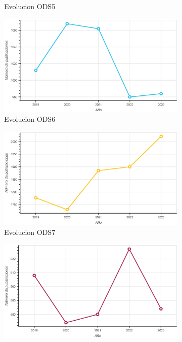 \begin{figure}[H]
\begin{subfigure}{0.45\textwidth}
        \captionsetup{justification=centering}
        \caption{Evolucion ODS5}
        \label{fig:Evolucion ods5}
    \end{subfigure}
    \begin{subfigure}{0.45\textwidth}
        \includegraphics[width=0.9\linewidth]{imagenes/EvolucionOds6.eps} 
        \captionsetup{justification=centering}
        \caption{Evolucion ODS6}
        \label{fig:Evolucion ods6}
    \end{subfigure}
    \begin{subfigure}{0.45\textwidth}
        \includegraphics[width=0.9\linewidth]{imagenes/EvolucionOds7.eps} 
        \captionsetup{justification=centering}
        \caption{Evolucion ODS7}
        \label{fig:Evolucion ods7}
    \end{subfigure}
    \begin{subfigure}{0.45\textwidth}
        \includegraphics[width=0.9\linewidth]{imagenes/EvolucionOds8.eps} 

\end{subfigure}
\end{figure}
